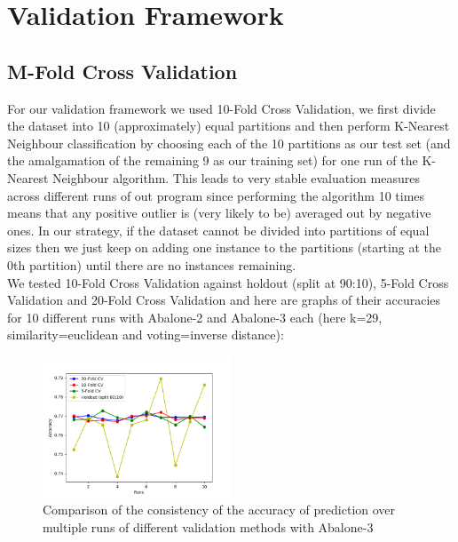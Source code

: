 

\section{Validation Framework}

\subsection{M-Fold Cross Validation}

For our validation framework we used 10-Fold Cross Validation, we first divide the dataset into 10 (approximately) equal partitions and then perform K-Nearest Neighbour classification by choosing each of the 10 partitions as our test set (and the amalgamation of the remaining 9 as our training set) for one run of the K-Nearest Neighbour algorithm. This leads to very stable evaluation measures across different runs of out program since performing the algorithm 10 times means that any positive outlier is (very likely to be) averaged out by negative ones. In our strategy, if the dataset cannot be divided into partitions of equal sizes then we just keep on adding one instance to the partitions (starting at the 0th partition) until there are no instances remaining.\\

We tested 10-Fold Cross Validation against holdout (split at 90:10), 5-Fold Cross Validation and 20-Fold Cross Validation and here are graphs of their accuracies for 10 different runs with Abalone-2 and Abalone-3 each (here k=29, similarity=euclidean and voting=inverse distance):



\begin{figure}[!htb]
\centering

\includegraphics[width=0.5\textwidth]{consistency_comparison_3.png}
\caption{Comparison of the consistency of the accuracy of prediction over multiple runs of different validation methods with Abalone-3}
\end{figure}

